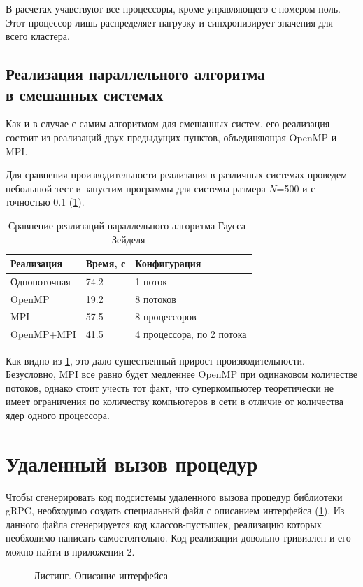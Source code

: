 \documentclass[a4paper,14pt,indentfirst]{extreport}
\begin{document}
В расчетах учавствуют все процессоры, кроме управляющего с номером ноль. Этот процессор лишь распределяет нагрузку и синхронизирует значения для всего кластера.

\subsection{Реализация параллельного алгоритма\\в смешанных системах}
Как и в случае с самим алгоритмом для смешанных систем, его реализация состоит из реализаций двух предыдущих пунктов, объединяющая OpenMP и MPI.

Для сравнения производительности реализация в различных системах проведем небольшой тест и запустим программы для системы размера $N$=500 и с точностью 0.1 (\cref{perftest}).
\begin{table}[H]
  \centering
  \caption{}
  \begin{subtable}[t]{\linewidth}
    \centering
    \caption*{Сравнение реализаций параллельного алгоритма Гаусса-Зейделя}
    \begin{tabular}{|l|l|l|}
      \hline
      Реализация   & Время, с & Конфигурация              \\ \hline
      Однопоточная & 74.2     & 1 поток                   \\ \hline
      OpenMP       & 19.2     & 8 потоков                 \\ \hline
      MPI          & 57.5     & 8 процессоров             \\ \hline
      OpenMP+MPI   & 41.5     & 4 процессора, по 2 потока \\ \hline
    \end{tabular}
  \end{subtable}
  \label{perftest}
\end{table}

Как видно из \cref{perftest}, это дало существенный прирост производительности. Безусловно, MPI все равно будет медленнее OpenMP при одинаковом количестве потоков, однако стоит учесть тот факт, что суперкомпьютер теоретически не имеет ограничения по количеству компьютеров в сети в отличие от количества ядер одного процессора.
\section{Удаленный вызов процедур}
Чтобы сгенерировать код подсистемы удаленного вызова процедур библиотеки gRPC, необходимо создать специальный файл с описанием интерфейса (\cref{cluster}). Из данного файла сгенерируется код классов-пустышек, реализацию которых необходимо написать самостоятельно. Код реализации довольно тривиален и его можно найти в приложении 2.
\begin{figure}[H]
  
  \caption{Листинг. Описание интерфейса}
  \label{cluster}
\end{figure}
\end{document}
